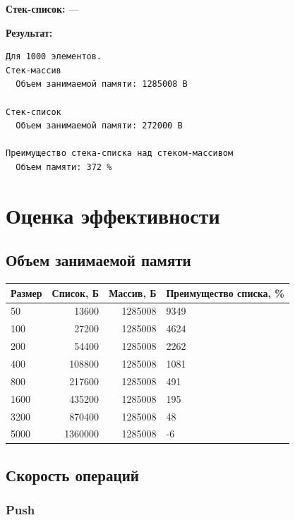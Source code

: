 \documentclass[a4paper,12pt]{extarticle}
\begin{document}
\textbf{Стек-список: }
---

\textbf{Результат: }

\begin{verbatim}
Для 1000 элементов.
Стек-массив
  Объем занимаемой памяти: 1285008 B

Стек-список
  Объем занимаемой памяти: 272000 B

Преимущество стека-списка над стеком-массивом
  Объем памяти: 372 %
\end{verbatim}

\newpage

\section{Оценка эффективности}
\subsection{Объем занимаемой памяти}


\begin{tabular}{ |l|r|r|l| }
\hline
\textbf{Размер} &  \textbf{Список, Б} & \textbf{Массив, Б} & \textbf{Преимущество списка, \%} \\ \hline

50 & 13600 & 1285008 & 9349 \\ \hline
100 & 27200 & 1285008 & 4624 \\ \hline
200 & 54400 & 1285008 & 2262 \\ \hline
400 & 108800 & 1285008 & 1081 \\ \hline
800 & 217600 & 1285008 & 491 \\ \hline
1600 & 435200 & 1285008 & 195 \\ \hline
3200 & 870400 & 1285008 & 48 \\ \hline
5000 & 1360000 & 1285008 & -6 \\ \hline

\end{tabular}

\subsection{Скорость операций}

\subsubsection{Push}
\end{document}
